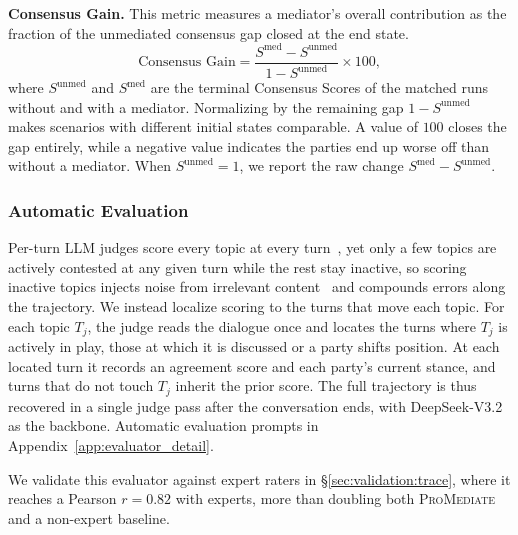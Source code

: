 \smallskip\smallskip\noindent\textbf{{Consensus Gain.}} This metric measures a mediator's overall contribution as the fraction of the unmediated consensus gap closed at the end state.
\[\text{Consensus Gain} =
\frac{S^\mathrm{med} - S^\mathrm{unmed}}{1 - S^\mathrm{unmed}} \times 100,\]
where $S^\mathrm{unmed}$ and $S^\mathrm{med}$ are the terminal Consensus Scores of the matched runs without and with a mediator. Normalizing by the remaining gap $1 - S^\mathrm{unmed}$ makes scenarios with different initial states comparable. A value of $100$ closes the gap entirely, while a negative value indicates the parties end up worse off than without a mediator. When $S^\mathrm{unmed} = 1$, we report the raw change $S^\mathrm{med} - S^\mathrm{unmed}$.



\subsubsection{Automatic Evaluation}
\label{sec:method:evaluation:auto}

Per-turn LLM judges score every topic at every turn~\citep{liu2025promediate}, yet only a few topics are actively contested at any given turn while the rest stay inactive, so scoring inactive topics injects noise from irrelevant content~\citep{koo2024benchmarking, ye2025justice} and compounds errors along the trajectory. We instead localize scoring to the turns that move each topic. For each topic $T_j$, the judge reads the dialogue once and locates the turns where $T_j$ is actively in play, those at which it is discussed or a party shifts position. At each located turn it records an agreement score and each party's current stance, and turns that do not touch $T_j$ inherit the prior score. The full trajectory is thus recovered in a single judge pass after the conversation ends, with DeepSeek-V3.2 as the backbone. Automatic evaluation prompts in Appendix~\ref{app:evaluator_detail}.

We validate this evaluator against expert raters in \S\ref{sec:validation:trace}, where it reaches a Pearson $r = 0.82$ with experts, more than doubling both \textsc{ProMediate}~\citep{liu2025promediate} and a non-expert baseline.





